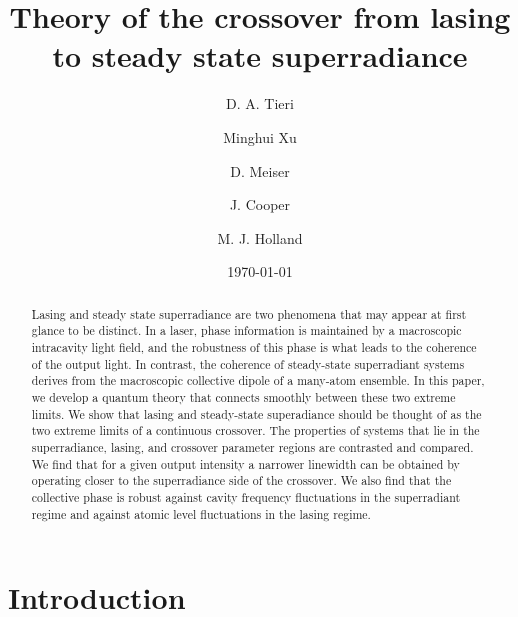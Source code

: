 \documentclass[aps,
twocolumn,
showpacs,
superscriptaddress,groupedaddress]{revtex4}
\begin{document}
\title{Theory of the crossover from lasing to steady state superradiance}
\author{D. A. Tieri}
\author{Minghui Xu}
\author{D. Meiser}
\author{J. Cooper}
\author{M. J. Holland}
\date{\today}

\begin{abstract}
  Lasing and steady state superradiance are two phenomena that may
  appear at first glance to be distinct.  In a laser, phase information
  is maintained by a macroscopic intracavity light field, and the
  robustness of this phase is what leads to the coherence of the output
  light.  In contrast, the coherence of steady-state superradiant
  systems derives from the macroscopic collective dipole of a many-atom
  ensemble.  In this paper, we develop a quantum theory that connects
  smoothly between these two extreme limits.  We show that lasing and
  steady-state superadiance should be thought of as the two extreme
  limits of a continuous crossover. The properties of systems that lie
  in the superradiance, lasing, and crossover parameter regions are
  contrasted and compared.  We find that for a given output intensity a
  narrower linewidth can be obtained by operating closer to the
  superradiance side of the crossover.  We also find that the collective
  phase is robust against cavity frequency fluctuations in the
  superradiant regime and against atomic level fluctuations in the
  lasing regime.
\end{abstract}



\maketitle

\section{Introduction}
\end{document}
